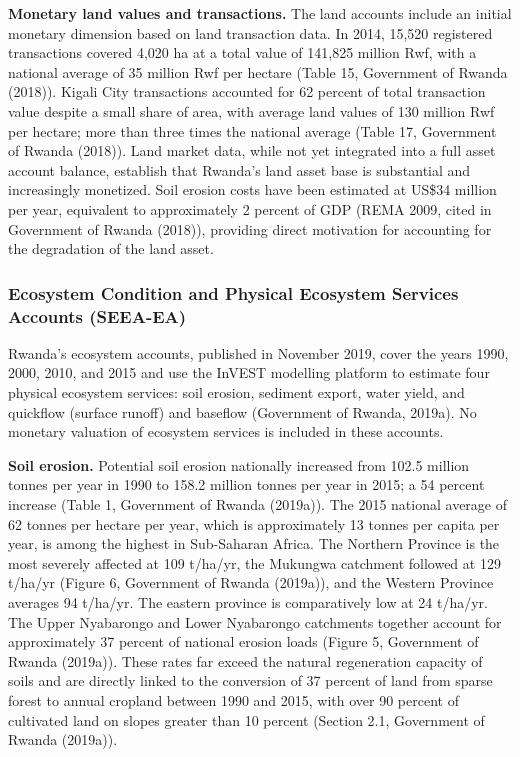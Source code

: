 \documentclass[
  letterpaper,
  DIV=11,
  numbers=noendperiod]{scrartcl}
\begin{document}
\textbf{Monetary land values and transactions.} The land accounts
include an initial monetary dimension based on land transaction data. In
2014, 15,520 registered transactions covered 4,020 ha at a total value
of 141,825 million Rwf, with a national average of 35 million Rwf per
hectare (Table 15, Government of Rwanda (2018)). Kigali City
transactions accounted for 62 percent of total transaction value despite
a small share of area, with average land values of 130 million Rwf per
hectare; more than three times the national average (Table 17,
Government of Rwanda (2018)). Land market data, while not yet integrated
into a full asset account balance, establish that Rwanda's land asset
base is substantial and increasingly monetized. Soil erosion costs have
been estimated at US\$34 million per year, equivalent to approximately 2
percent of GDP (REMA 2009, cited in Government of Rwanda (2018)),
providing direct motivation for accounting for the degradation of the
land asset.

\subsubsection{Ecosystem Condition and Physical Ecosystem Services
Accounts
(SEEA-EA)}\label{ecosystem-condition-and-physical-ecosystem-services-accounts-seea-ea}

Rwanda's ecosystem accounts, published in November 2019, cover the years
1990, 2000, 2010, and 2015 and use the InVEST modelling platform to
estimate four physical ecosystem services: soil erosion, sediment
export, water yield, and quickflow (surface runoff) and baseflow
(Government of Rwanda, 2019a). No monetary valuation of ecosystem
services is included in these accounts.

\textbf{Soil erosion.} Potential soil erosion nationally increased from
102.5 million tonnes per year in 1990 to 158.2 million tonnes per year
in 2015; a 54 percent increase (Table 1, Government of Rwanda (2019a)).
The 2015 national average of 62 tonnes per hectare per year, which is
approximately 13 tonnes per capita per year, is among the highest in
Sub-Saharan Africa. The Northern Province is the most severely affected
at 109 t/ha/yr, the Mukungwa catchment followed at 129 t/ha/yr (Figure
6, Government of Rwanda (2019a)), and the Western Province averages 94
t/ha/yr. The eastern province is comparatively low at 24 t/ha/yr. The
Upper Nyabarongo and Lower Nyabarongo catchments together account for
approximately 37 percent of national erosion loads (Figure 5, Government
of Rwanda (2019a)). These rates far exceed the natural regeneration
capacity of soils and are directly linked to the conversion of 37
percent of land from sparse forest to annual cropland between 1990 and
2015, with over 90 percent of cultivated land on slopes greater than 10
percent (Section 2.1, Government of Rwanda (2019a)).
\end{document}
